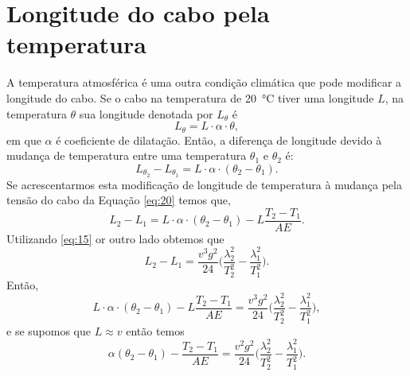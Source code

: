 \section{Longitude do cabo pela temperatura}

A temperatura atmosférica é uma outra condição climática que pode
modificar a longitude do cabo. Se o cabo na temperatura de
\SI{20}{\degreeCelsius} tiver uma longitude $L$, na temperatura
$\theta$ sua longitude denotada por $L_{\theta}$ é
\begin{displaymath}
  L_{\theta}=L\cdot\alpha\cdot\theta,
\end{displaymath}
em que $\alpha$ é coeficiente de dilatação. Então, a diferença de
longitude devido à mudança de temperatura entre uma temperatura
$\theta_1$ e $\theta_2$ é:
\begin{displaymath}
  L_{\theta_2}-L_{\theta_1} = L\cdot\alpha\cdot(\theta_2-\theta_1).
\end{displaymath}
Se acrescentarmos esta modificação de longitude de temperatura à
mudança pela tensão do cabo da Equação \eqref{eq:20} temos que,
\begin{displaymath}
  L_2-L_1 = L\cdot\alpha\cdot(\theta_2-\theta_1)-L\frac{T_2-T_1}{AE}.
\end{displaymath}
Utilizando \eqref{eq:15}  or outro lado obtemos que
\begin{equation}
  \label{eq:21}
  L_2-L_1=\frac{v^3g^2}{24}\Big(\frac{\lambda_2^2}{T_2^2}-\frac{\lambda_1^2}{T_1^2}\Big).
\end{equation}
Então,
\begin{displaymath}
  L\cdot\alpha\cdot(\theta_2-\theta_1)-L\frac{T_2-T_1}{AE}=\frac{v^3g^2}{24}\Big(\frac{\lambda_2^2}{T_2^2}-\frac{\lambda_1^2}{T_1^2}\Big),
\end{displaymath}
e se supomos que $L\approx{}v$  então temos
\begin{equation}
  \label{eq:7}
  \alpha(\theta_2-\theta_1)-\frac{T_2-T_1}{AE}
  =\frac{v^2g^2}{24}\Big(\frac{\lambda_2^2}{T_2^2}-\frac{\lambda_1^2}{T_1^2}\Big).
\end{equation}

